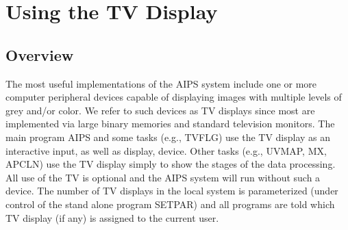 \setcounter{chapter}{9} %
\chapter{Using the TV Display}
\setcounter{page}{1}
\section{Overview}
The most useful implementations of the AIPS system include one or more
computer peripheral devices capable of displaying images with multiple
levels of grey and/or color.  We refer to such devices as TV displays
since most are implemented via large binary memories and standard
television monitors.  The main program AIPS and some tasks (e.g.,
TVFLG) use the TV display as an interactive input, as well as display,
device.  Other tasks (e.g., UVMAP, MX, APCLN) use the TV display
simply to show the stages of the data processing. All use of the TV is
optional and the AIPS system will run without such a device. The
number of TV displays in the local system is
parameterized (under
control of the stand alone program SETPAR) and all programs are told
which TV display (if any) is assigned to the current user.

